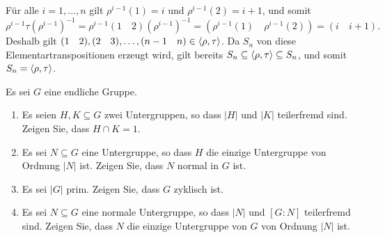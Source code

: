 \begin{solution}
  Für alle $i = 1, \dotsc, n$ gilt $\rho^{i-1}(1) = i$ und $\rho^{i-1}(2) = i+1$, und somit
  \[
    \rho^{i-1} \tau (\rho^{i-1})^{-1}
    = \rho^{i-1} (1 \quad 2) (\rho^{i-1})^{-1}
    = (\rho^{i-1}(1) \quad \rho^{i-1}(2))
    = (i \quad i+1).
  \]
  Deshalb gilt $(1 \quad 2), (2 \quad 3), \dotsc, (n-1 \quad n) \in \left\langle \rho, \tau \right\rangle$.
  Da $S_n$ von diese Elementartranspositionen erzeugt wird, gilt bereits $S_n \subseteq \left\langle \rho, \tau \right\rangle \subseteq S_n$, und somit $S_n = \left\langle \rho, \tau \right\rangle$.
\end{solution}


\begin{question}[subtitle = Zur Ordnung]
  Es sei $G$ eine endliche Gruppe.
  \begin{enumerate}
    \item
      Es seien $H, K \subseteq G$ zwei Untergruppen, so dass $|H|$ und $|K|$ teilerfremd sind.
      Zeigen Sie, dass $H \cap K = 1$.
    \item
      Es sei $N \subseteq G$ eine Untergruppe, so dass $H$ die einzige Untergruppe von Ordnung $|N|$ ist.
      Zeigen Sie, dass $N$ normal in $G$ ist.
    \item
      Es sei $|G|$ prim.
      Zeigen Sie, dass $G$ zyklisch ist.
    \item
      Es sei $N \subseteq G$ eine normale Untergruppe, so dass $|N|$ und $[G : N]$ teilerfremd sind.
      Zeigen Sie, dass $N$ die einzige Untergruppe von $G$ von Ordnung $|N|$ ist.
  \end{enumerate}
\end{question}


